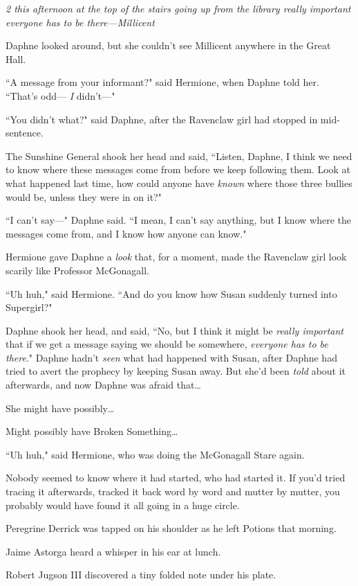 \emph{2 this afternoon at the top of the stairs going up from the library \emph{really important} everyone has to be there—Millicent}

Daphne looked around, but she couldn't see Millicent anywhere in the Great Hall.

``A message from your informant?" said Hermione, when Daphne told her. ``That's odd— \emph{I} didn't—"

``You didn't what?" said Daphne, after the Ravenclaw girl had stopped in mid-sentence.

The Sunshine General shook her head and said, ``Listen, Daphne, I think we need to know where these messages come from before we keep following them. Look at what happened last time, how could anyone have \emph{known} where those three bullies would be, unless they were in on it?"

``I can't say—" Daphne said. ``I mean, I can't say anything, but I know where the messages come from, and I know how anyone can know."

Hermione gave Daphne a \emph{look} that, for a moment, made the Ravenclaw girl look scarily like Professor McGonagall.

``Uh huh," said Hermione. ``And do you know how Susan suddenly turned into Supergirl?"

Daphne shook her head, and said, ``No, but I think it might be \emph{really important} that if we get a message saying we should be somewhere, \emph{everyone has to be there}." Daphne hadn't \emph{seen} what had happened with Susan, after Daphne had tried to avert the prophecy by keeping Susan away. But she'd been \emph{told} about it afterwards, and now Daphne was afraid that{\ldots}

She might have possibly{\ldots}

Might possibly have Broken Something{\ldots}

``Uh huh," said Hermione, who was doing the McGonagall Stare again.

\later

Nobody seemed to know where it had started, who had started it. If you'd tried tracing it afterwards, tracked it back word by word and mutter by mutter, you probably would have found it all going in a huge circle.

Peregrine Derrick was tapped on his shoulder as he left Potions that morning.

Jaime Astorga heard a whisper in his ear at lunch.

Robert Jugson III discovered a tiny folded note under his plate.

